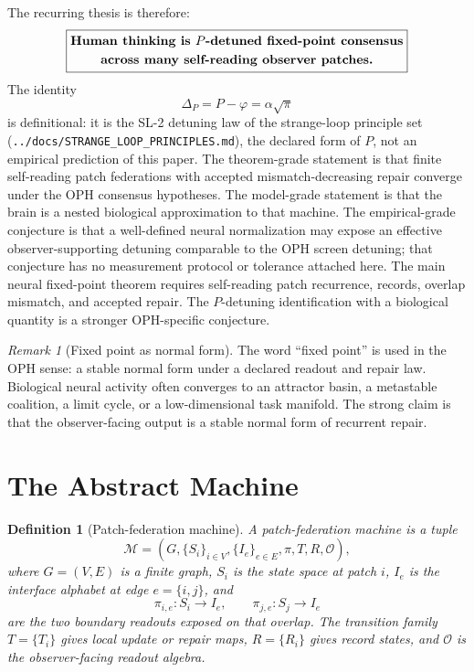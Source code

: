 \documentclass[11pt]{article}
\newtheorem{definition}[theorem]{Definition}
\theoremstyle{remark}
\newtheorem{remark}[theorem]{Remark}
\theoremstyle{plain}
\begin{document}
The recurring thesis is therefore:
\[
\boxed{
\begin{gathered}
\text{\bfseries Human thinking is }P\text{\bfseries -detuned fixed-point consensus}\\
\text{\bfseries across many self-reading observer patches.}
\end{gathered}
}
\]
The identity
\[
\Delta_P=P-\varphi=\alpha\sqrt{\pi}
\]
is definitional: it is the SL-2 detuning law of the strange-loop principle set (\texttt{../docs/STRANGE\_LOOP\_PRINCIPLES.md}), the declared form of \(P\), not an empirical prediction of this paper. The theorem-grade statement is that finite self-reading patch federations with accepted mismatch-decreasing repair converge under the OPH consensus hypotheses. The model-grade statement is that the brain is a nested biological approximation to that machine. The empirical-grade conjecture is that a well-defined neural normalization may expose an effective observer-supporting detuning comparable to the OPH screen detuning; that conjecture has no measurement protocol or tolerance attached here.
The main neural fixed-point theorem requires self-reading patch recurrence, records, overlap mismatch, and accepted repair. The \(P\)-detuning identification with a biological quantity is a stronger OPH-specific conjecture.

\begin{remark}[Fixed point as normal form]
The word ``fixed point'' is used in the OPH sense: a stable normal form under a declared readout and repair law. Biological neural activity often converges to an attractor basin, a metastable coalition, a limit cycle, or a low-dimensional task manifold. The strong claim is that the observer-facing output is a stable normal form of recurrent repair.
\end{remark}

\section{The Abstract Machine}

\begin{definition}[Patch-federation machine]
A patch-federation machine is a tuple
\[
\mathcal M=(G,\{S_i\}_{i\in V},\{I_e\}_{e\in E},\pi,T,R,\mathcal O),
\]
where \(G=(V,E)\) is a finite graph, \(S_i\) is the state space at patch \(i\), \(I_e\) is the interface alphabet at edge \(e=\{i,j\}\), and
\[
\pi_{i,e}:S_i\to I_e,\qquad \pi_{j,e}:S_j\to I_e
\]
are the two boundary readouts exposed on that overlap. The transition family \(T=\{T_i\}\) gives local update or repair maps, \(R=\{R_i\}\) gives record states, and \(\mathcal O\) is the observer-facing readout algebra.
\end{definition}
\end{document}
